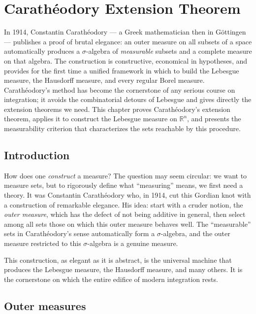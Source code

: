 \chapter{Carath\'eodory Extension Theorem}
\label{ch:caratheodory}

In 1914, Constantin Carathéodory --- a Greek mathematician then in Göttingen --- publishes a proof of brutal elegance: an outer measure on all subsets of a space automatically produces a $\sigma$-algebra of \emph{measurable} subsets and a complete measure on that algebra. The construction is constructive, economical in hypotheses, and provides for the first time a unified framework in which to build the Lebesgue measure, the Hausdorff measure, and every regular Borel measure. Carathéodory's method has become the cornerstone of any serious course on integration; it avoids the combinatorial detours of Lebesgue and gives directly the extension theorems we need. This chapter proves Carathéodory's extension theorem, applies it to construct the Lebesgue measure on $\mathbb{R}^n$, and presents the measurability criterion that characterizes the sets reachable by this procedure.

\section{Introduction}

How does one \emph{construct} a measure? The question may seem circular: we want to measure sets, but to rigorously define what ``measuring'' means, we first need a theory. It was Constantin Carath\'eodory who, in 1914, cut this Gordian knot with a construction of remarkable elegance. His idea: start with a cruder notion, the \emph{outer measure}, which has the defect of not being additive in general, then select among all sets those on which this outer measure behaves well. The ``measurable'' sets in Carath\'eodory's sense automatically form a $\sigma$-algebra, and the outer measure restricted to this $\sigma$-algebra is a genuine measure.

This construction, as elegant as it is abstract, is the universal machine that produces the Lebesgue measure, the Hausdorff measure, and many others. It is the cornerstone on which the entire edifice of modern integration rests.

\section{Outer measures}

